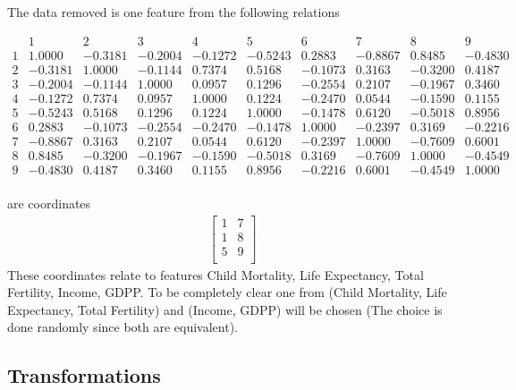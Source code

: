 \documentclass[12pt, a4paper]{article}
\begin{document}
The data removed is one feature from the following relations
\begin{center}
\[
\begin{array}{c|rrrrrrrrr}
  & 1 & 2 & 3 & 4 & 5 & 6 & 7 & 8 & 9 \\
\hline
1 &  1.0000 & -0.3181 & -0.2004 & -0.1272 & -0.5243 &  0.2883 & -0.8867 &  0.8485 & -0.4830 \\
2 & -0.3181 &  1.0000 & -0.1144 &  0.7374 &  0.5168 & -0.1073 &  0.3163 & -0.3200 &  0.4187 \\
3 & -0.2004 & -0.1144 &  1.0000 &  0.0957 &  0.1296 & -0.2554 &  0.2107 & -0.1967 &  0.3460 \\
4 & -0.1272 &  0.7374 &  0.0957 &  1.0000 &  0.1224 & -0.2470 &  0.0544 & -0.1590 &  0.1155 \\
5 & -0.5243 &  0.5168 &  0.1296 &  0.1224 &  1.0000 & -0.1478 &  0.6120 & -0.5018 &  0.8956 \\
6 &  0.2883 & -0.1073 & -0.2554 & -0.2470 & -0.1478 &  1.0000 & -0.2397 &  0.3169 & -0.2216 \\
7 & -0.8867 &  0.3163 &  0.2107 &  0.0544 &  0.6120 & -0.2397 &  1.0000 & -0.7609 &  0.6001 \\
8 &  0.8485 & -0.3200 & -0.1967 & -0.1590 & -0.5018 &  0.3169 & -0.7609 &  1.0000 & -0.4549 \\
9 & -0.4830 &  0.4187 &  0.3460 &  0.1155 &  0.8956 & -0.2216 &  0.6001 & -0.4549 &  1.0000 \\
\end{array}
\]
\end{center}
are coordinates
\begin{equation*}
    \begin{split}
        \left[\begin{matrix}
            1 & 7 \\
            1 & 8 \\
            5 & 9 \\
        \end{matrix}\right]
    \end{split}
\end{equation*}
These coordinates relate to features Child Mortality, Life Expectancy, Total Fertility, Income, GDPP. To be completely clear one from (Child Mortality, Life Expectancy, Total Fertility) and (Income, GDPP) will be chosen (The choice is done randomly since both are equivalent).

\subsection{Transformations}
\end{document}
